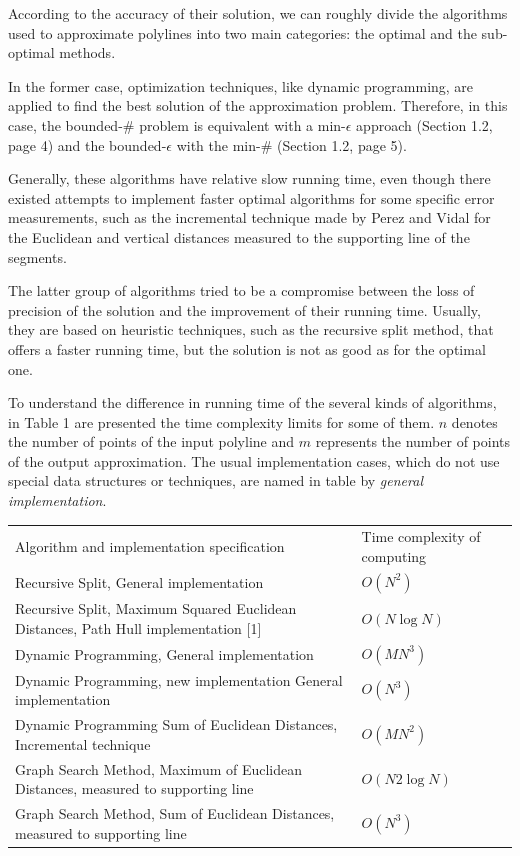 According to the accuracy of their solution, we can roughly divide the
algorithms used to approximate polylines into two main
categories: the optimal and the sub-optimal methods.

In the former case, optimization techniques, like dynamic programming,
are applied to find the best solution of the approximation
problem. Therefore, in this case, the bounded-$\#$ problem is equivalent
with a min-$\epsilon$ approach (Section 1.2, page 4) and the bounded-$\epsilon$ with the
min-$\#$ (Section 1.2, page 5).

Generally, these algorithms have relative slow running time, even
though there existed attempts to implement faster optimal algorithms
for some specific error measurements, such as the incremental
technique made by Perez and Vidal \cite{cgal:pv-opadc-94} for the Euclidean and vertical
distances measured to the supporting line of the segments.

The latter group of algorithms tried to be a compromise between the
loss of precision of the solution and the improvement of their running
time. Usually, they are based on heuristic techniques, such as the
recursive split method, that offers a faster running time, but the
solution is not as good as for the optimal one.

To understand the difference in running time of the several kinds of
algorithms, in Table 1 are presented the time complexity limits for
some of them. $n$ denotes the number of points of the input polyline and $m$
represents the number of points of the output approximation. The usual
implementation cases, which do not use special data structures or
techniques, are named in table by {\em general implementation}.


\begin{tabularx}{10cm}{|L|L}
Algorithm and implementation specification &  Time complexity of computing \\ 
Recursive Split, \cite{dp-arnpr-73}
General implementation                     &  $O(N^2)$ \\
Recursive Split, 
Maximum Squared Euclidean Distances, Path Hull implementation [1]
                                           & $O(N \log N)$ \\
Dynamic Programming, \cite{cgal:gt-dpasrcp-93}
General implementation
                                           & $O(MN^3)$ \\
Dynamic Programming, new implementation
General implementation                     & $O(N^3)$\\

Dynamic Programming 
Sum of Euclidean Distances, Incremental technique \cite{cgal:pv-opadc-94}
                                           & $O(MN^2)$ \\
Graph Search Method, \cite{cgal:ii-pac}
Maximum of Euclidean Distances, measured to supporting line
                                           & $O(N2\log N)$ \\
Graph Search Method, 
Sum of Euclidean Distances, measured to supporting line
                                           & $O(N^3)$\\
\end{tabularx}


